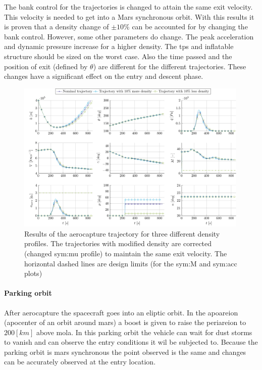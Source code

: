 The bank control for the trajectories is changed to attain the same exit velocity. This velocity is needed to get into a Mars synchronous orbit. With this results it is proven that a density change of $\pm 10\%$ can be accounted for by changing the bank control. However, some other parameters do change. The peak acceleration and dynamic pressure increase for a higher density. The \gls{tps} and inflatable structure should be sized on the worst case. Also the time passed and the position of exit (defined by $\theta$) are different for the different trajectories. These changes have a significant effect on the entry and descent phase.
\begin{figure}
	\centering
	\includegraphics[width=0.99\textwidth]{Figure/Orbit/sensitivity_aerocapture.pdf}
	\caption{Results of the aerocapture trajectory for three different density profiles. The trajectories with modified density are corrected (changed \gls{sym:mu} profile) to maintain the same exit velocity. The horizontal dashed lines are design limits (for the \gls{sym:M} and \gls{sym:acc} plots) }
	\label{fig:orbit_aerocapture_data}
\end{figure}

\paragraph{Parking orbit}
After aerocapture the spacecraft goes into an eliptic orbit. In the apoareion (apocenter of an orbit around mars) a boost is given to raise the periareion to $200 \left[km\right]$ above \gls{mola}. In this parking orbit the vehicle can wait for dust storms to vanish and can observe the entry conditions it wil be subjected to. Because the parking orbit is mars synchronous the point observed is the same and changes can be accurately observed at the entry location. 

